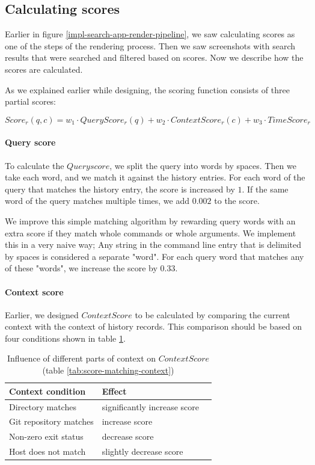 \clearpage
\subsection{Calculating scores}

Earlier in figure \ref{impl-search-app-render-pipeline}, we saw calculating scores as one of the steps of the rendering process. Then we saw screenshots with search results that were searched and filtered based on scores. Now we describe how the scores are calculated.

As we explained earlier while designing, the scoring function consists of three partial scores:

\[ Score_r(q,c) = w_1 \cdot QueryScore_r(q) + w_2 \cdot ContextScore_r(c) + w_3 \cdot TimeScore_r \]


\paragraph{Query score}

To calculate the \(Query score\), we split the query into words by spaces. Then we take each word, and we match it against the history entries. For each word of the query that matches the history entry, the score is increased by \(1\). If the same word of the query matches multiple times, we add \(0.002\) to the score. 


We improve this simple matching algorithm by rewarding query words with an extra score if they match whole commands or whole arguments. We implement this in a very naive way; Any string in the command line entry that is delimited by spaces is considered a separate "word". For each query word that matches any of these "words", we increase the score by \(0.33\).

\paragraph{Context score}

Earlier, we designed \(ContextScore\) to be calculated by comparing the current context with the context of history records. This comparison should be based on four conditions shown in table \ref{tab:copy-of-score-matching-context}.

\begin{table}[h!]
\centering
\begin{tabular}{lll}
\hline \hline
Context condition & Effect \\
\hline
Directory matches & significantly increase score \\ 
Git repository matches & increase score \\ 
Non-zero exit status & decrease score \\
Host does not match & slightly decrease score \\ 
\hline \hline
\end{tabular}
\caption{Influence of different parts of context on \(ContextScore\) (table \ref{tab:score-matching-context})}
\label{tab:copy-of-score-matching-context}
\end{table}


